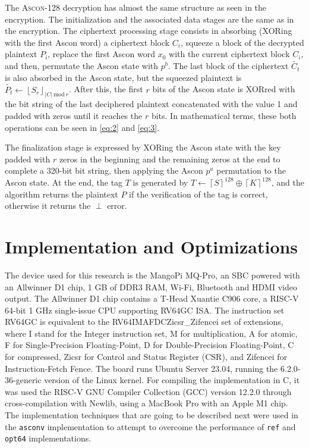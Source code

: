 \documentclass[11pt,twoside]{article}
\begin{document}
The \textsc{Ascon-128} decryption has almost the same structure as seen in the encryption. The initialization and the associated data stages are the same as in the encryption. The ciphertext processing stage consists in absorbing (XORing with the first Ascon word) a ciphertext block $C_i$, squeeze  a block of the decrypted plaintext $P_i$, replace the first Ascon word $x_0$ with the current ciphertext block $C_i$, and then, permutate the Ascon state with $p^b$. The last block of the ciphertext $\tilde{C_t}$ is also absorbed in the Ascon state, but the squeezed plaintext is $\tilde{P_t} \leftarrow {\left \lfloor  S_r \right \rfloor}_{|C| \ \textrm{mod} \ r}$. After this, the first $r$ bits of the Ascon state is XORred with the bit string of the last deciphered plaintext concatenated with the value 1 and padded with zeros until it reaches the $r$ bits. In mathematical terms, these both operations can be seen in \cref{eq:2} and \cref{eq:3}.

The finalization stage is expressed by XORing the Ascon state with the key padded with $r$ zeros in the beginning and the remaining zeros at the end to complete a 320-bit bit string, then applying the Ascon $p^a$ permutation to the Ascon state. At the end, the tag $T$ is generated by $T \leftarrow {\left \lceil  S \right \rceil}^{128} \oplus  {\left \lceil  K \right \rceil}^{128}$, and the algorithm returns the plaintext $P$ if the verification of the tag is correct, otherwise it returns the $\perp$ error.

\section{Implementation and Optimizations}

The device used for this research is the MangoPi MQ-Pro, an SBC powered with an Allwinner D1 chip, 1 GB of DDR3 RAM, Wi-Fi, Bluetooth and HDMI video output. The Allwinner D1 chip contains a T-Head Xuantie C906 core, a RISC-V 64-bit 1 GHz single-issue CPU supporting \textsf{RV64GC} ISA. The instruction set \textsf{RV64GC} is equivalent to the \textsf{RV64IMAFDCZicsr\_Zifencei} set of extensions, where \textsf{I} stand for the Integer instruction set, \textsf{M} for multiplication, \textsf{A} for atomic, \textsf{F} for Single-Precision Floating-Point, \textsf{D} for Double-Precision Floating-Point, \textsf{C} for compressed, \textsf{Zicsr} for Control and Status Register (CSR), and \textsf{Zifencei} for Instruction-Fetch Fence. The board runs Ubuntu Server 23.04, running the 6.2.0-36-generic version of the Linux kernel. For compiling the implementation in C, it was used the RISC-V GNU Compiler Collection (GCC) version 12.2.0 \cite{riscvgnutoolchainv2023} through cross-compilation with Newlib, using a MacBook Pro with an Apple M1 chip. The implementation techniques that are going to be described next were used in the \texttt{asconv} implementation to attempt to overcome the performance of \texttt{ref} and \texttt{opt64} implementations.
\end{document}
